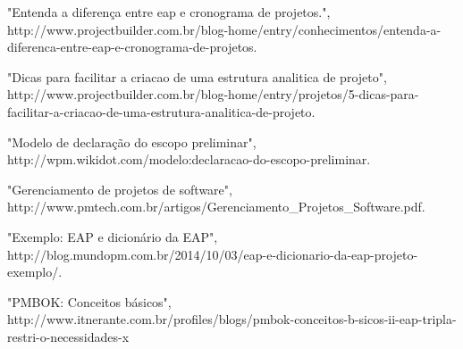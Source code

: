 \documentclass[
	12pt,				%
	oneside,			%
	a4paper,			%
	brazil				%
	]{abntex2}
\begin{document}

\begin{thebibliography}{4}

 "Entenda a diferença entre eap e cronograma de projetos.", http://www.projectbuilder.com.br/blog-home/entry/conhecimentos/entenda-a-diferenca-entre-eap-e-cronograma-de-projetos.

 "Dicas para facilitar a criacao de uma estrutura analitica de projeto", http://www.projectbuilder.com.br/blog-home/entry/projetos/5-dicas-para-facilitar-a-criacao-de-uma-estrutura-analitica-de-projeto.

 "Modelo de declaração do escopo preliminar", http://wpm.wikidot.com/modelo:declaracao-do-escopo-preliminar.

 "Gerenciamento de projetos de software", http://www.pmtech.com.br/artigos/Gerenciamento\_Projetos\_Software.pdf.

 "Exemplo: EAP e dicionário da EAP", http://blog.mundopm.com.br/2014/10/03/eap-e-dicionario-da-eap-projeto-exemplo/.

 "PMBOK: Conceitos básicos", http://www.itnerante.com.br/profiles/blogs/pmbok-conceitos-b-sicos-ii-eap-tripla-restri-o-necessidades-x

\end{thebibliography}




\printindex
\end{document}
